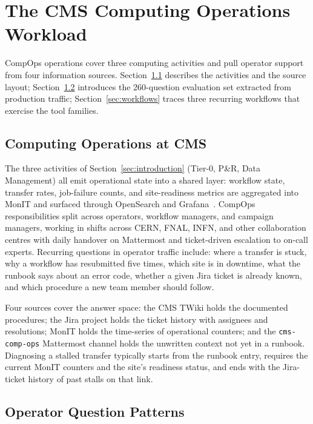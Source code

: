 \section{The CMS Computing Operations Workload}
\label{sec:workload}

CompOps operations cover three computing activities and pull
operator support from four information sources.
Section~\ref{sec:compops_domain} describes the activities and
the source layout; Section~\ref{sec:question_patterns}
introduces the 260-question evaluation set extracted from
production traffic; Section~\ref{sec:workflows} traces three
recurring workflows that exercise the tool families.

\subsection{Computing Operations at CMS}
\label{sec:compops_domain}

The three activities of Section~\ref{sec:introduction} (Tier-0,
P\&R, Data Management) all emit operational state into a shared
layer: workflow state, transfer rates, job-failure counts, and
site-readiness metrics are aggregated into MonIT and surfaced
through OpenSearch and Grafana~\cite{cms_monit}. CompOps
responsibilities split across operators, workflow managers, and
campaign managers, working in shifts across CERN, FNAL, INFN, and
other collaboration centres with daily handover on Mattermost and
ticket-driven escalation to on-call experts. Recurring questions in operator traffic include: where a
transfer is stuck, why a workflow has resubmitted five times,
which site is in downtime, what the runbook says about an error
code, whether a given Jira ticket is already known, and which
procedure a new team member should follow.

Four sources cover the answer space: the CMS TWiki holds the
documented procedures; the Jira project holds the ticket history
with assignees and resolutions; MonIT holds the time-series of
operational counters; and the \texttt{cms-comp-ops} Mattermost
channel holds the unwritten context not yet in a runbook.
Diagnosing a stalled transfer typically starts from the runbook
entry, requires the current MonIT counters and the site's
readiness status, and ends with the Jira-ticket history of past
stalls on that link.

\subsection{Operator Question Patterns}
\label{sec:question_patterns}

